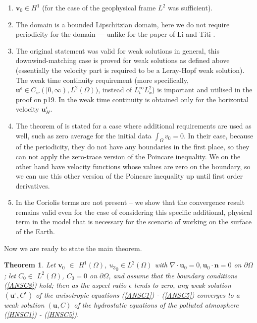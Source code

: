 \documentclass[11pt]{article}
\newtheorem{theorem}{Theorem}
\begin{document}
\begin{enumerate}

  \item $\mathbf{v}_0 \in H^1$ (for the case of the geophysical frame $L^2$ was sufficient). 
  \item The domain is a bounded Lipschitzian domain, here we do not require periodicity for the domain --- unlike for the paper of Li and Titi \cite{li2019primitive}.
  \item The original statement was valid for weak solutions in general, this downwind-matching case is proved for weak solutions as defined above (essentially the velocity part is required to be a Leray-Hopf weak solution). The weak time continuity requirement (more specifically, $\mathbf{u}^\epsilon \in C_w( [ 0,\infty), L^2 (\Omega))$, instead of $L^\infty_t L^2_x$) is important and utilised in the proof on p19. In \cite{azerad2001mathematical} the weak time continuity is obtained only for the horizontal velocity $\mathbf{u}^\epsilon_H.$
  \item The theorem of \cite{li2019primitive} is stated for a case where additional requirements are used as well, such as zero average for the initial data $\int_\Omega v_0 = 0$. In their case, because of the periodicity, they do not have any boundaries in the first place, so they can not apply the zero-trace version of the Poincare inequality. We on the other hand have velocity functions whose values are zero on the boundary, so we can use this other version of the Poincare inequality up until first order derivatives.
  \item In \cite{li2019primitive} the Coriolis terms are not present -- we show that the convergence result remains valid even for the case of considering this specific additional, physical term in the model that is necessary for the scenario of working on the surface of the Earth.

\end{enumerate}

Now we are ready to state the main theorem.

\begin{theorem} \label{maintheorem}
  Let $\mathbf{v}_0$ $\in$ $H^1 (\Omega)$, ${u_3}_0 \in L^2(\Omega)$ with $\nabla \cdot \mathbf{u}_0 = 0, \mathbf{u}_0 \cdot \mathbf{n} = 0$ on $\partial \Omega$; let $C_0 \in$ $L^2 (\Omega)$, $C_0 = 0$ on $ \partial \Omega$, and assume that the boundary conditions (\ref{ANSC8}) hold; then as the aspect ratio $\epsilon$ tends to zero, any weak solution $(\mathbf{u}^\epsilon, C^\epsilon)$ of the anisotropic equations (\ref{ANSC1}) - (\ref{ANSC5}) converges to a weak solution $(\mathbf{u}, C)$ of the hydrostatic equations of the polluted atmosphere (\ref{HNSC1}) - (\ref{HNSC5}).
\end{theorem}
  
\end{document}
